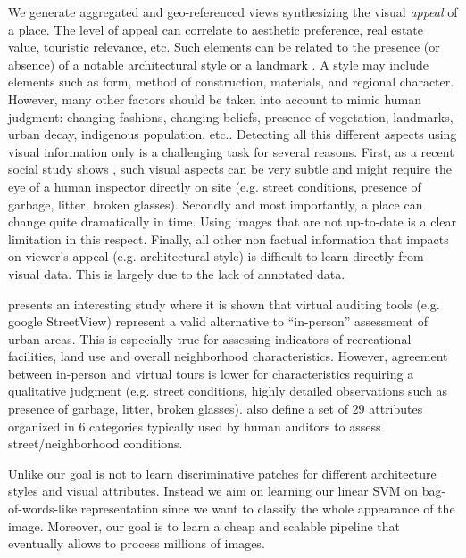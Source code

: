 \documentclass[runningheads, table]{llncs}
\begin{document}
{\color{red}{\bf THIS IS STILL A MESS.. BE PATIENT HERE..}
We generate aggregated and geo-referenced views synthesizing the visual \emph{appeal} of a place. The level of appeal can correlate to aesthetic preference, real estate value, touristic relevance, etc. 
Such elements can be related to the presence (or absence) of a notable architectural style or a landmark \cite{weyand2011discovering}. A style may include elements such as form, method of construction, materials, and regional character. 
However, many other factors should be taken into account to mimic human judgment: changing fashions, changing beliefs, presence of vegetation, landmarks, urban decay, indigenous population, etc.. Detecting all this different aspects using visual information only is a challenging task for several reasons. First, as a recent social study shows \cite{audit2011}, such visual aspects can be very subtle and might require the eye of a human inspector directly on site  (e.g. street conditions, presence of garbage, litter, broken glasses).
Secondly and most importantly, a place can change quite dramatically in time. Using images that are not up-to-date is a clear limitation in this respect. Finally, all other non factual information that impacts on viewer's appeal (e.g. architectural style) is difficult to learn directly from visual data. This is largely due to the lack of annotated data. 

\cite{audit2011} presents an interesting study where it is shown that virtual auditing tools (e.g. google StreetView) represent a valid alternative to ``in-person'' assessment of urban areas. This is especially true for assessing indicators of recreational facilities, land use and overall neighborhood characteristics. However, agreement between in-person and virtual tours is lower for characteristics requiring a qualitative judgment (e.g. street conditions, highly detailed observations such as presence of garbage, litter, broken glasses). 
\cite{audit2011} also define a set of 29 attributes organized in 6 categories typically used by human auditors to assess street/neighborhood conditions.
}

Unlike \cite{Doersch} our goal is not to learn discriminative patches for different architecture styles and visual attributes. Instead we aim on learning our linear SVM on bag-of-words-like representation since we want to classify the whole appearance of the image. Moreover, our goal is to learn a cheap and scalable pipeline that eventually allows to process millions of images.
\end{document}
